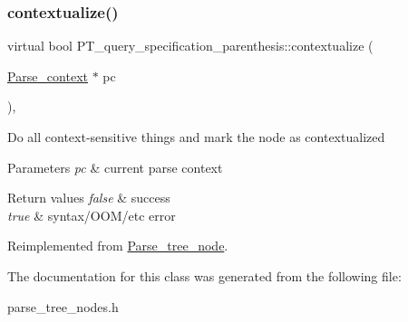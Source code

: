 \subsubsection{\texorpdfstring{contextualize()}{contextualize()}}
{\footnotesize\ttfamily virtual bool P\+T\+\_\+query\+\_\+specification\+\_\+parenthesis\+::contextualize (\begin{DoxyParamCaption}\item[{\mbox{\hyperlink{structParse__context}{Parse\+\_\+context}} $\ast$}]{pc }\end{DoxyParamCaption})\hspace{0.3cm}{\ttfamily [inline]}, {\ttfamily [virtual]}}

Do all context-\/sensitive things and mark the node as contextualized


\begin{DoxyParams}{Parameters}
{\em pc} & current parse context\\
\hline
\end{DoxyParams}

\begin{DoxyRetVals}{Return values}
{\em false} & success \\
\hline
{\em true} & syntax/\+O\+O\+M/etc error \\
\hline
\end{DoxyRetVals}


Reimplemented from \mbox{\hyperlink{classParse__tree__node_a22d93524a537d0df652d7efa144f23da}{Parse\+\_\+tree\+\_\+node}}.



The documentation for this class was generated from the following file\+:\begin{DoxyCompactItemize}
\item 
parse\+\_\+tree\+\_\+nodes.\+h\end{DoxyCompactItemize}

